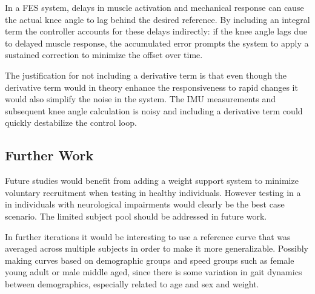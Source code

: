 In a FES system, delays in muscle activation and mechanical response can cause the actual knee angle to lag behind the desired reference. By including an integral term the controller accounts for these delays indirectly: if the knee angle lags due to delayed muscle response, the accumulated error prompts the system to apply a sustained correction to minimize the offset over time.

The justification for not including a derivative term is that even though the derivative term would in theory enhance the responsiveness to rapid changes it would also simplify the noise in the system. The IMU measurements and subsequent knee angle calculation is noisy and including a derivative term could quickly destabilize the control loop.

\subsection{Further Work}
Future studies would benefit from adding a weight support system to minimize voluntary recruitment when testing in healthy individuals. However testing in a in individuals with neurological impairments would clearly be the best case scenario. The limited subject pool should be addressed in future work.

In further iterations it would be interesting to use a reference curve that was averaged across multiple subjects in order to make it more generalizable. Possibly making curves based on demographic groups and speed groups such as female young adult or male middle aged, since there is some variation in gait dynamics between demographics, especially related to age and sex and weight.

